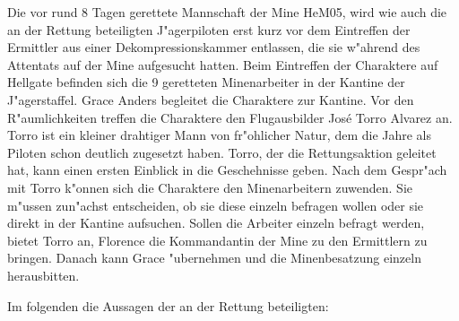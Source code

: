 
Die vor rund 8 Tagen gerettete Mannschaft der Mine HeM05, wird wie auch die an der Rettung beteiligten J"agerpiloten erst kurz vor dem Eintreffen der Ermittler aus einer Dekompressionskammer entlassen, die sie w"ahrend des Attentats auf der Mine aufgesucht hatten. Beim Eintreffen der Charaktere auf Hellgate befinden sich die 9 geretteten Minenarbeiter in der Kantine der J"agerstaffel. Grace Anders begleitet die Charaktere zur Kantine. Vor den R"aumlichkeiten treffen die Charaktere den Flugausbilder Jos\'{e} \frqq{}Torro\flqq{} Alvarez an. Torro ist ein kleiner drahtiger Mann von fr"ohlicher Natur, dem die Jahre als Piloten schon deutlich zugesetzt haben. Torro, der die Rettungsaktion geleitet hat, kann einen ersten Einblick in die Geschehnisse geben. Nach dem Gespr"ach mit Torro k"onnen sich die Charaktere den Minenarbeitern zuwenden. Sie m"ussen zun"achst entscheiden, ob sie diese einzeln befragen wollen oder sie direkt in der Kantine aufsuchen. Sollen die Arbeiter einzeln befragt werden, bietet Torro an, Florence die Kommandantin der Mine zu den Ermittlern zu bringen. Danach kann Grace "ubernehmen und die Minenbesatzung einzeln herausbitten.

Im folgenden die Aussagen der an der Rettung beteiligten:

